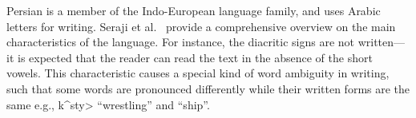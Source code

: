 Persian is a member of the Indo-European language family, and uses Arabic letters for writing. %
Seraji et al.~ provide a comprehensive overview on the main characteristics of the language. %
For instance, the diacritic signs are not written---it is expected that the reader can read the text in the absence of the short vowels. This characteristic causes a special kind of word ambiguity in writing, such that some words are pronounced differently while their written forms are the same e.g., \<k^sty> ``wrestling'' and ``ship''.



